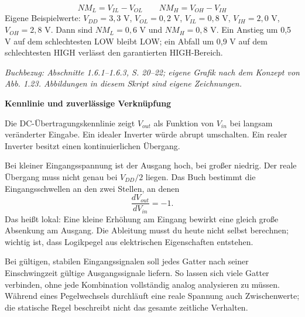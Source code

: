 \documentclass[10pt,a4paper]{article}
\newcommand{\titlepagepart}[2]{\vspace*{-4mm}{\sffamily\small #1}\par{\sffamily\LARGE\bfseries #2}\par\vspace{2mm}}
\newcommand{\block}[1]{\par\vspace{2mm}{\sffamily\large\bfseries #1}\par}
\newcommand{\source}[1]{\par{\footnotesize\itshape Buchbezug: #1. Abbildungen in diesem Skript sind eigene Zeichnungen.}}
\begin{document}
\block{Störabstand: Wie viel Reserve bleibt?}
\[\boxed{NM_L=V_{IL}-V_{OL}}\qquad\boxed{NM_H=V_{OH}-V_{IH}}\]
Eigene Beispielwerte: $V_{DD}=3{,}3$ V, $V_{OL}=0{,}2$ V,
$V_{IL}=0{,}8$ V, $V_{IH}=2{,}0$ V, $V_{OH}=2{,}8$ V.
Dann sind $NM_L=0{,}6$ V und $NM_H=0{,}8$ V.
Ein Anstieg um 0,5 V auf dem schlechtesten LOW bleibt LOW; ein Abfall um 0,9 V
auf dem schlechtesten HIGH verlässt den garantierten HIGH-Bereich.
\source{Abschnitte 1.6.1--1.6.3, S. 20--22; eigene Grafik nach dem Konzept von Abb. 1.23}

\newpage
\titlepagepart{07 / VOM ANALOGEN ZUM DIGITALEN}{Kennlinie und zuverlässige Verknüpfung}
\block{Ein Inverter ist elektrisch nicht ideal}
Die DC-Übertragungskennlinie zeigt $V_{out}$ als Funktion von $V_{in}$ bei
langsam veränderter Eingabe. Ein idealer Inverter würde abrupt umschalten.
Ein realer Inverter besitzt einen kontinuierlichen Übergang.
\begin{center}
\end{center}
Bei kleiner Eingangsspannung ist der Ausgang hoch, bei großer niedrig.
Der reale Übergang muss nicht genau bei $V_{DD}/2$ liegen.
Das Buch bestimmt die Eingangsschwellen an den zwei Stellen, an denen
\[\frac{dV_{out}}{dV_{in}}=-1.\]
Das heißt lokal: Eine kleine Erhöhung am Eingang bewirkt eine gleich große
Absenkung am Ausgang. Die Ableitung musst du heute nicht selbst berechnen;
wichtig ist, dass Logikpegel aus elektrischen Eigenschaften entstehen.

\block{Static Discipline: Gültig hinein, gültig heraus}
Bei gültigen, stabilen Eingangssignalen soll jedes Gatter nach seiner
Einschwingzeit gültige Ausgangssignale liefern. So lassen sich viele Gatter
verbinden, ohne jede Kombination vollständig analog analysieren zu müssen.
Während eines Pegelwechsels durchläuft eine reale Spannung auch Zwischenwerte;
die statische Regel beschreibt nicht das gesamte zeitliche Verhalten.
\end{document}
